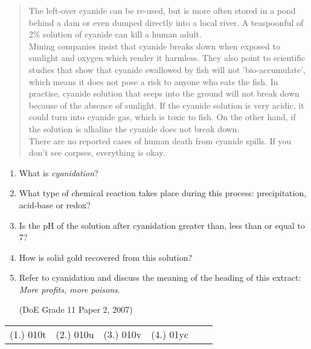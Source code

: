 \begin{eocexercises}{}
\begin{enumerate}
{\begin{quote}
{The left-over cyanide can be re-used, but is more often stored in a pond behind a dam or even dumped directly into a local river. A teaspoonful of 2\% solution of cyanide can kill a human adult.\\

Mining companies insist that cyanide breaks down when exposed to sunlight and oxygen which render it harmless. They also point to scientific studies that show that cyanide swallowed by fish will not 'bio-accumulate', which means it does not pose a risk to anyone who eats the fish. In practise, cyanide solution that seeps into the ground will not break down because of the absence of sunlight. If the cyanide solution is very acidic, it could turn into cyanide gas, which is toxic to fish. On the other hand, if the solution is alkaline the cyanide does not break down.\\

There are no reported cases of human death from cyanide spills. If you don't see corpses, everything is okay.
}
\end{quote}
}
\begin{enumerate}
\item{What is \textit{cyanidation}?}
\item{What type of chemical reaction takes place during this process: precipitation, acid-base or redox?}
\item{Is the pH of the solution after cyanidation greater than, less than or equal to 7?}
\item{How is solid gold recovered from this solution?}
\item{Refer to cyanidation and discuss the meaning of the heading of this extract: \textit{More profits, more poisons}.}

(DoE Grade 11 Paper 2, 2007)
\end{enumerate}
\end{enumerate}

\practiceinfo

\begin{tabular}[h]{cccccc}
(1.) 010t & (2.) 010u & (3.) 010v & (4.) 01yc &
 \end{tabular}
\end{eocexercises}










